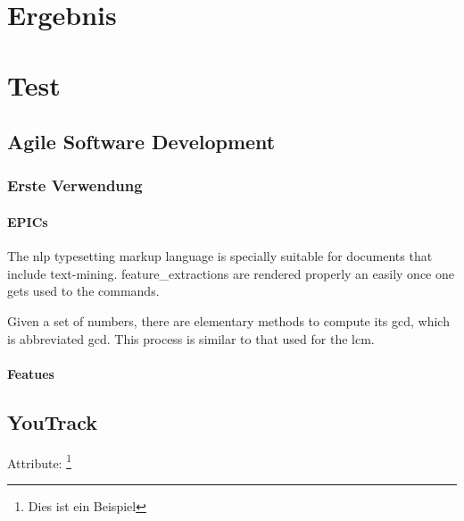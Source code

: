 \chapter{Ergebnis}

\lipsum[3-5]

\chapter{Test}

\lipsum[3-5]

\section{Agile Software Development}

\lipsum[3-5]

\subsection{Erste Verwendung}

\lipsum[3-5]

\subsubsection{EPICs}

The \Gls{nlp} typesetting markup language is specially suitable 
for documents that include \gls{text-mining}. \Glspl{feature_extraction} are 
rendered properly an easily once one gets used to the commands.

Given a set of numbers, there are elementary methods to compute 
its \acrlong{gcd}, which is abbreviated \acrshort{gcd}. This 
process is similar to that used for the \acrfull{lcm}.

\subsubsection{Featues}

\lipsum[3-5]

\section{YouTrack}

Attribute: \footnote{Dies ist ein Beispiel}

\lipsum[3-5]


